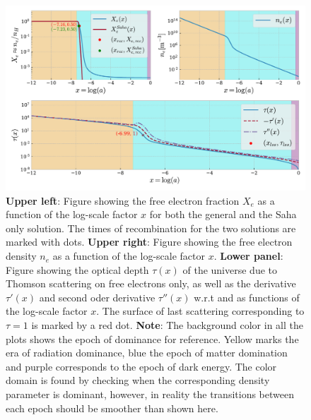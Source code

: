 \documentclass[twocolumn]{aastex62}
\begin{document}
\begin{figure}
    \includegraphics[scale = 0.65]{Figures/Xe_ne_tau.pdf}
    \caption{\textbf{Upper left}: Figure showing the free electron fraction $X_e$ 
    as a function of the log-scale factor $x$ for both the general and the Saha only solution. The times of recombination for the two solutions are marked with dots. \textbf{Upper right}: Figure showing the free electron density $n_e$
    as a function of the log-scale factor $x$. \textbf{Lower panel}: Figure showing the optical depth $\tau(x)$ of the universe due to 
    Thomson scattering on free electrons only, as well as the derivative $\tau'(x)$ and second oder derivative $\tau''(x)$ w.r.t 
    and as functions of the log-scale factor $x$. The surface of last scattering corresponding to $\tau = 1$ is marked by a red dot. \textbf{Note}: The background color in all the plots shows the epoch of dominance
    for reference. Yellow marks the era of radiation dominance, blue the epoch of matter domination
    and purple corresponds to the epoch of dark energy. The color domain is found by checking 
    when the corresponding density parameter is dominant,
    however, in reality the transitions between each epoch should be smoother than shown here.}
    \label{fig:Xe}
\end{figure}
\end{document}
